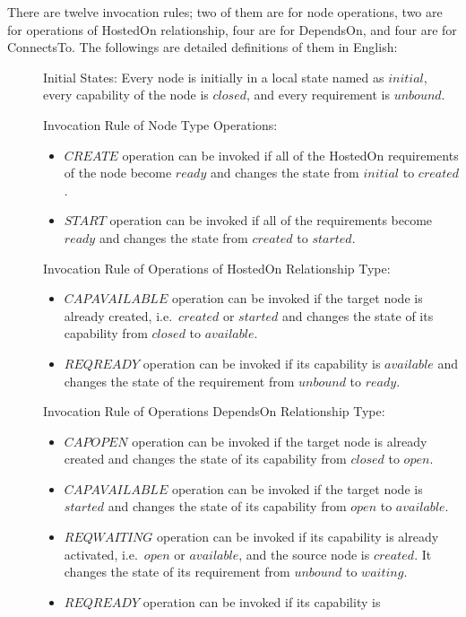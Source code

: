 \documentclass[12pt]{report}
\begin{document}
There are twelve invocation rules; two of them are for node
operations, two are for operations of HostedOn relationship, four are
for DependsOn, and four are for ConnectsTo. The followings are
detailed definitions of them in English:
\begin{description}
\item[]Initial States: Every node is initially in a local state named
  as $initial$, every capability of the node is $closed$, and every
  requirement is $unbound$.
\item[] Invocation Rule of Node Type Operations:
  \begin{itemize}
  \item $CREATE$ operation can be invoked if all of the HostedOn
    requirements of the node become $ready$ and changes the state from
    $initial$ to $created$.
  \item $START$ operation can be invoked if all of the requirements
    become $ready$ and changes the state from $created$ to $started$.
  \end{itemize}
\item[] Invocation Rule of Operations of HostedOn Relationship Type:
  \begin{itemize}
  \item $CAPAVAILABLE$ operation can be invoked if the target node is
    already created, i.e.\ $created$ or $started$ and changes the state
    of its capability from $closed$ to $available$.
  \item $REQREADY$ operation can be invoked if its capability is
    $available$ and changes the state of the requirement from $unbound$
    to $ready$.
  \end{itemize}
\item[] Invocation Rule of Operations DependsOn Relationship Type:
  \begin{itemize}
  \item $CAPOPEN$ operation can be invoked if the target node is
    already created and changes the state of its capability from
    $closed$ to $open$.
  \item $CAPAVAILABLE$ operation can be invoked if the target node is
    $started$ and changes the state of its capability from
    $open$ to $available$.
  \item $REQWAITING$ operation can be invoked if its capability is already
    activated, i.e.\ $open$ or $available$, and the source node is
    $created$. It changes the state of its requirement from
    $unbound$ to $waiting$.
  \item $REQREADY$ operation can be invoked if its capability is

\end{itemize}
\end{description}
\end{document}
